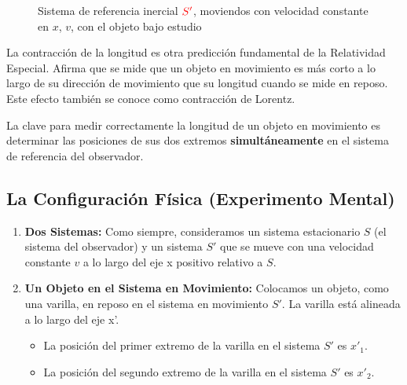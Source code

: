 \documentclass[11pt,a4paper]{article}
\begin{document}
\begin{figure}
    \caption{Sistema de referencia inercial $\color{red}S'$, moviendos con velocidad constante en $x$, $v$, con el objeto bajo estudio }
    \label{fig:movruler}
\end{figure}




La contracción de la longitud es otra predicción fundamental de la Relatividad Especial. Afirma que se mide que un objeto en movimiento es más corto a lo largo de su dirección de movimiento que su longitud cuando se mide en reposo. Este efecto también se conoce como contracción de Lorentz.

La clave para medir correctamente la longitud de un objeto en movimiento es determinar las posiciones de sus dos extremos \textbf{simultáneamente} en el sistema de referencia del observador.

\subsection{La Configuración Física (Experimento Mental)}

\begin{enumerate}
    \item \textbf{Dos Sistemas:} Como siempre, consideramos un sistema estacionario $S$ (el sistema del observador) y un sistema $S'$ que se mueve con una velocidad constante $v$ a lo largo del eje x positivo relativo a $S$.

    \item \textbf{Un Objeto en el Sistema en Movimiento:} Colocamos un objeto, como una varilla, en reposo en el sistema en movimiento $S'$. La varilla está alineada a lo largo del eje x'.
    \begin{itemize}
        \item La posición del primer extremo de la varilla en el sistema $S'$ es $x'_1$.
        \item La posición del segundo extremo de la varilla en el sistema $S'$ es $x'_2$.
    \end{itemize}
\end{enumerate}
\end{document}
